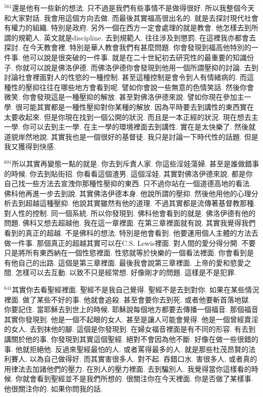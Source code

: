 \documentclass{book}
\begin{document}
$^{561}$還是他有一些新的想法.
只不過是我們有些事情不是做得很好.
所以我整個今天和大家對話.
我會用這個方向去做.
而最後其實福高很出名的.
就是去探討現代社會有權力的組織.
特別是政府.
另外一個在西方一定會處理的就是教會.
他怎樣去到所謂的規範人.
英文就是discipline.
去到規範人.
往往涉及到懲罰.
在這裡我亦都會去探討.
在今天教會裡.
特別是華人教會我們有甚麼問題.
你會發現到福高他特別的一件事.
他可以說是很突破的一件事.
就是在二十世紀初去研究性的最重要的知識份子.
你就可以說是佛洛伊德.
而佛洛伊德你會發現到他用一個所謂壓抑的討論.
去到討論社會裡面對人的性慾的一種控制.
甚至這種控制是會令到人有情緒病的.
而這種性的壓抑往往在哪些地方會看到呢.
譬如你會說一些無意的色情笑話.
然後你會微笑.
你會發現這是一種壓抑的解放.
甚至對佛洛伊德來說.
譬如你現在參加主一學.
很可能其實都是一種性壓抑對你某種的解放.
因為平時要去到講性的東西實在太要收起來.
但是你現在找到一個公開的狀況.
而且是一本正經的狀況.
現在想去主一學.
你可以去到主一學.
在主一學的環境裡面去到講性.
實在是太快樂了.
然後就道貌岸然地說.
其實我也是一個很好的基督徒.
我只是討論一下時代性的話題.
但是我又獲得到快感.

$^{601}$所以其實再變態一點的就是.
你去到斥責人家.
你這些淫娃蕩婦.
甚至是誰做錯事的時候.
你去到貼街招.
你看看這個渣男.
這個淫娃.
其實對佛洛伊德來說.
都是你自己找一些方法去宣洩你那種性壓抑的東西.
只不過你站在一個道德高地的看法.
佛科他再進一步去到說.
其實佛洛伊德本身.
他說所謂的壓抑.
然後他用他的心理分析去到超越這種壓抑.
他說其實雖然有他的道理.
不過其實都是流傳著基督教那種.
對人性的控制.
同一個系統.
所以你發現到.
佛科他會看到的就是.
佛洛伊德有他的問題.
佛科又想去超越他.
我在這一章裡面.
在第三章裡面就有說.
其實我覺得我們看到的真正的超越.
不是佛科的想法.
特別是他會看到.
他要運用個人主體的方法去做一件事.
那個真正的超越其實可以在C.S. Lewis裡面.
對人間的愛分得分開.
不要只是將所有東西納在一個性慾裡面.
性慾就等於快樂的一個看法裡面.
你會看到是有他自己的出路.
這個是第三章裡面.
最後我會說第三章裡面.
上帝的愛和慾愛之間.
怎樣可以去互動.
以致不只是經常想.
好像剛才的問題.
這樣是不是犯罪.

$^{641}$其實你去看聖經裡面.
聖經不是我自己覺得.
聖經不是去到對你.
如果在某些情況裡面.
做了某些不好的事.
他就會追殺.
甚至會要你去到死.
或者他要斬首落地獄.
你要記住.
當耶穌去到世上的時候.
耶穌說每個地方都要去傳播一個福音.
那個福音其實你發現到.
他是一個不起眼的女人.
甚至是讓人可能會覺得.
他是一個曾經賣淫的女人.
去到抹他的腳.
這個是你發現到.
在婦女福音裡面是有不同的形容.
有去到講關於他的事.
你發現到其實這個聖經.
絕對不會因為他不斷.
好像在做一些很錯的事.
他就拒絕他.
反過來聖經最怕的人.
或者罵得最多的人.
就是那些杜茂昂賢的法利賽人.
以為自己做得好.
而其實害很多人.
對不起.
吞錯口水.
害很多人.
或者真的用律法去加諸他們的壓力.
在別人的壓力裡面.
去到騙別人.
我覺得當你這樣看的時候.
你就會看到聖經並不是我們所想的.
很關注你在今天裡面.
你是否做了某樣事.
他很關注你的.
如果你問我的話.
\end{document}
